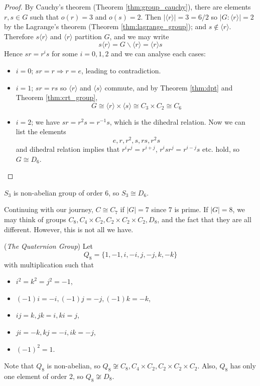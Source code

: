 \documentclass[10pt, a4paper, twoside]{report}
\begin{document}
\begin{proof}
    By Cauchy's theorem (Theorem \ref{thm:group_cauchy}), there are elements \(r,s\in G\) such that \(o(r)=3\) and \(o(s)=2\). Then \(|\langle r\rangle|=3=6/2\) so \(|G:\langle r\rangle|=2\) by the Lagrange's theorem (Theorem \ref{thm:lagrange_group}); and \(s\notin\langle r\rangle\). Therefore \(s\langle r\rangle\) and \(\langle r\rangle\) partition \(G\), and we may write 
    \[s\langle r\rangle=G\backslash\langle r\rangle=\langle r\rangle s\]
    Hence \(sr=r^is\) for some \(i=0,1,2\) and we can analyse each cases:
    \begin{itemize}
        \item \(i=0\); \(sr=r\Rightarrow r=e\), leading to contradiction.
        \item \(i=1\); \(sr=rs\) so \(\langle r\rangle\) and \(\langle s \rangle\) commute, and by Theorem \ref{thm:dpt} and Theorem \ref{thm:crt_group}, 
        \[G\cong\langle r\rangle\times\langle s\rangle\cong C_3\times C_2\cong C_6\]
        \item \(i=2\); we have \(sr=r^2s=r^{-1}s\), which is the dihedral relation. Now we can list the elements
        \[e,r,r^2,s,rs,r^2s\]
        and dihedral relation implies that \(r^ir^j=r^{i+j}\), \(r^isr^j=r^{i-j}s\) etc. hold, so \(G\cong D_6\).
    \end{itemize}
\end{proof}
\begin{remark}
    \(S_3\) is non-abelian group of order 6, so \(S_3\cong D_6\).
\end{remark}
Continuing with our journey, \(C\cong C_7\) if \(|G|=7\) since \(7\) is prime. If \(|G|=8\), we may think of groups \(C_8,C_4\times C_2,C_2\times C_2\times C_2,D_8\), and the fact that they are all different. However, this is not all we have.
\begin{example}
    (\emph{The Quaternion Group}) Let 
    \[Q_8=\{1,-1,i,-i,j,-j,k,-k\}\]
    with multiplication such that 
    \begin{itemize}
        \item \(i^2=k^2=j^2=-1\),
        \item \((-1)i=-i,(-1)j=-j,(-1)k=-k\),
        \item  \(ij=k,jk=i,ki=j\),
        \item \(ji=-k,kj=-i,ik=-j\),
        \item \((-1)^2=1\).
    \end{itemize}
    Note that \(Q_8\) is non-abelian, so \(Q_8\not\cong C_8,C_4\times C_2,C_2\times C_2\times C_2\). Also, \(Q_8\) has only one element of order 2, so \(Q_8\not\cong D_8\).
\end{example}
\end{document}

